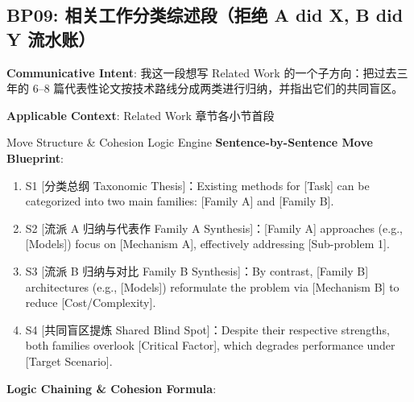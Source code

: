 \subsection{BP09: 相关工作分类综述段（拒绝 A did X, B did Y 流水账）}\label{sec:bp:BP09}
\noindent\textbf{\color{AcadNavy}Communicative Intent}: 我这一段想写 Related Work 的一个子方向：把过去三年的 6--8 篇代表性论文按技术路线分成两类进行归纳，并指出它们的共同盲区。\par\vspace{2pt}
\noindent\textbf{\color{AcadSlate}Applicable Context}: Related Work 章节各小节首段\par\vspace{4pt}
\begin{ConceptBox}{Move Structure \& Cohesion Logic Engine}
\textbf{Sentence-by-Sentence Move Blueprint}:
\begin{enumerate}[label=\textbf{\color{AcadNavy}S\arabic*.}, leftmargin=2em, itemsep=2pt]
  \item S1 [分类总纲 Taxonomic Thesis]：Existing methods for [Task] can be categorized into two main families: [Family A] and [Family B].
  \item S2 [流派 A 归纳与代表作 Family A Synthesis]：[Family A] approaches (e.g., [Models]) focus on [Mechanism A], effectively addressing [Sub-problem 1].
  \item S3 [流派 B 归纳与对比 Family B Synthesis]：By contrast, [Family B] architectures (e.g., [Models]) reformulate the problem via [Mechanism B] to reduce [Cost/Complexity].
  \item S4 [共同盲区提炼 Shared Blind Spot]：Despite their respective strengths, both families overlook [Critical Factor], which degrades performance under [Target Scenario].
\end{enumerate}\par\vspace{4pt}
\textbf{Logic Chaining \& Cohesion Formula}:\par{}
\end{ConceptBox}
